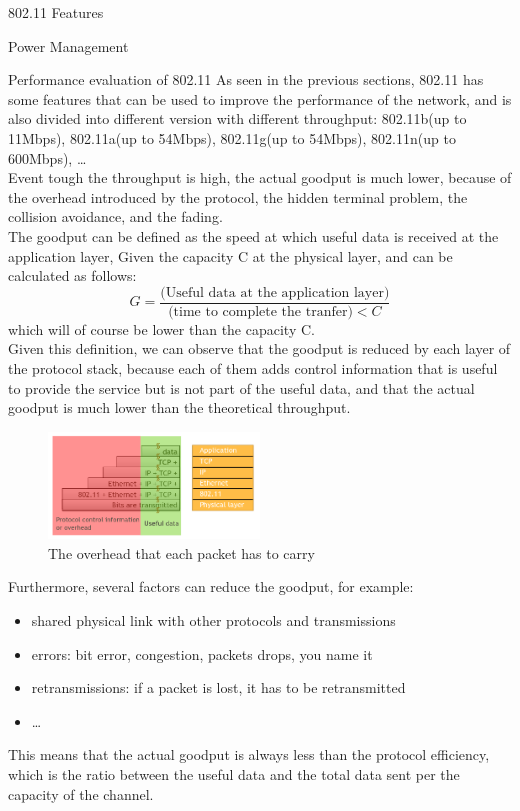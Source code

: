 \begin{section}{802.11 Features}
\begin{subsection}{Power Management}
  \end{subsection}

\end{section}
\begin{section}{Performance evaluation of 802.11}
  As seen in the previous sections, 802.11 has some features that can be used to improve the
  performance of the network, and is also divided into different version with different 
  throughput: 802.11b(up to 11Mbps), 802.11a(up to 54Mbps), 802.11g(up to 54Mbps), 802.11n(up to 600Mbps),
  \dots\\
  Event tough the throughput is high, the actual goodput is much lower, because of the overhead
  introduced by the protocol, the hidden terminal problem, the collision avoidance, and the fading.\\
  The goodput can be defined as the speed at which useful data is received at the application layer,
  Given the capacity C at the physical layer, and can be calculated as follows:
  \begin{equation}
    G = \frac{\text{(Useful data at the application layer)}}{\text{(time to complete the tranfer)}<C}
  \end{equation}
  which will of course be lower than the capacity C.\\
  Given this definition, we can observe that the goodput is reduced by each layer of the protocol stack,
  because each of them adds control information that is useful to provide the service but is not part of
  the useful data, and that the actual goodput is much lower than the theoretical throughput.\\
  \begin{figure}[h]
    \centering
    \includegraphics[width=0.5\textwidth]{img/wireless/encapsulation overhead.png}
    \caption{The overhead that each packet has to carry}
  \end{figure}
  Furthermore, several factors can reduce the goodput, for example:
  \begin{itemize}
    \item shared physical link with other protocols and transmissions
    \item errors: bit error, congestion, packets drops, you name it
    \item retransmissions: if a packet is lost, it has to be retransmitted
    \item \dots 
  \end{itemize}
  This means that the actual goodput is always less than the protocol efficiency, which is the
  ratio between the useful data and the total data sent per the capacity of the channel.\\


\end{section}
